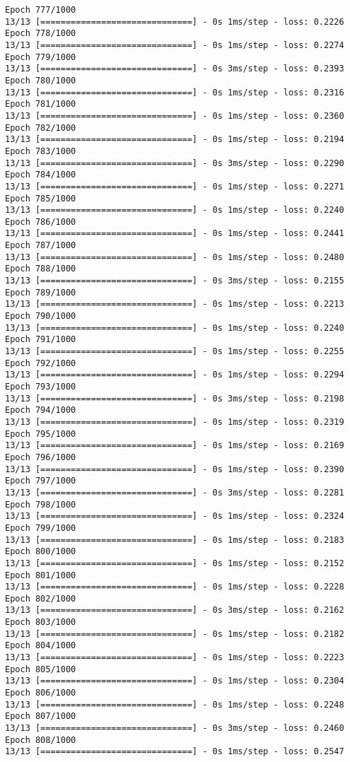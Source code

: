 \documentclass[11pt]{article}
\begin{document}
\begin{Verbatim}[commandchars=\\\{\}]
Epoch 777/1000
13/13 [==============================] - 0s 1ms/step - loss: 0.2226
Epoch 778/1000
13/13 [==============================] - 0s 1ms/step - loss: 0.2274
Epoch 779/1000
13/13 [==============================] - 0s 3ms/step - loss: 0.2393
Epoch 780/1000
13/13 [==============================] - 0s 1ms/step - loss: 0.2316
Epoch 781/1000
13/13 [==============================] - 0s 1ms/step - loss: 0.2360
Epoch 782/1000
13/13 [==============================] - 0s 1ms/step - loss: 0.2194
Epoch 783/1000
13/13 [==============================] - 0s 3ms/step - loss: 0.2290
Epoch 784/1000
13/13 [==============================] - 0s 1ms/step - loss: 0.2271
Epoch 785/1000
13/13 [==============================] - 0s 1ms/step - loss: 0.2240
Epoch 786/1000
13/13 [==============================] - 0s 1ms/step - loss: 0.2441
Epoch 787/1000
13/13 [==============================] - 0s 1ms/step - loss: 0.2480
Epoch 788/1000
13/13 [==============================] - 0s 3ms/step - loss: 0.2155
Epoch 789/1000
13/13 [==============================] - 0s 1ms/step - loss: 0.2213
Epoch 790/1000
13/13 [==============================] - 0s 1ms/step - loss: 0.2240
Epoch 791/1000
13/13 [==============================] - 0s 1ms/step - loss: 0.2255
Epoch 792/1000
13/13 [==============================] - 0s 1ms/step - loss: 0.2294
Epoch 793/1000
13/13 [==============================] - 0s 3ms/step - loss: 0.2198
Epoch 794/1000
13/13 [==============================] - 0s 1ms/step - loss: 0.2319
Epoch 795/1000
13/13 [==============================] - 0s 1ms/step - loss: 0.2169
Epoch 796/1000
13/13 [==============================] - 0s 1ms/step - loss: 0.2390
Epoch 797/1000
13/13 [==============================] - 0s 3ms/step - loss: 0.2281
Epoch 798/1000
13/13 [==============================] - 0s 1ms/step - loss: 0.2324
Epoch 799/1000
13/13 [==============================] - 0s 1ms/step - loss: 0.2183
Epoch 800/1000
13/13 [==============================] - 0s 1ms/step - loss: 0.2152
Epoch 801/1000
13/13 [==============================] - 0s 1ms/step - loss: 0.2228
Epoch 802/1000
13/13 [==============================] - 0s 3ms/step - loss: 0.2162
Epoch 803/1000
13/13 [==============================] - 0s 1ms/step - loss: 0.2182
Epoch 804/1000
13/13 [==============================] - 0s 1ms/step - loss: 0.2223
Epoch 805/1000
13/13 [==============================] - 0s 1ms/step - loss: 0.2304
Epoch 806/1000
13/13 [==============================] - 0s 1ms/step - loss: 0.2248
Epoch 807/1000
13/13 [==============================] - 0s 3ms/step - loss: 0.2460
Epoch 808/1000
13/13 [==============================] - 0s 1ms/step - loss: 0.2547

\end{Verbatim}
\end{document}
